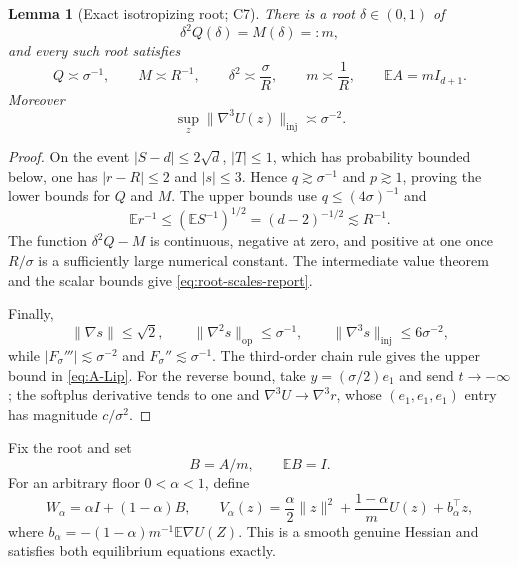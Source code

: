 \documentclass[11pt]{article}
\numberwithin{equation}{section}
\newtheorem{lemma}[theorem]{Lemma}
\newcommand{\E}{\mathbb E}
\newcommand{\op}{\mathrm{op}}
\newcommand{\inj}{\mathrm{inj}}
\begin{document}
\begin{lemma}[Exact isotropizing root; C7]\label{lem:root}
There is a root $\delta\in(0,1)$ of
\begin{equation}\label{eq:root}
 \delta^2Q(\delta)=M(\delta)=:m,
\end{equation}
and every such root satisfies
\begin{equation}\label{eq:root-scales-report}
 Q\asymp\sigma^{-1},\qquad M\asymp R^{-1},\qquad
 \delta^2\asymp\frac\sigma R,\qquad m\asymp\frac1R,\qquad
 \E A=mI_{d+1}.
\end{equation}
Moreover
\begin{equation}\label{eq:A-Lip}
 \sup_z\|\nabla^3U(z)\|_{\inj}\asymp\sigma^{-2}.
\end{equation}
\end{lemma}

\begin{proof}
On the event $|S-d|\le2\sqrt d$, $|T|\le1$, which has probability bounded
below, one has $|r-R|\le2$ and $|s|\le3$.  Hence
$q\gtrsim\sigma^{-1}$ and $p\gtrsim1$, proving the lower bounds for $Q$ and
$M$.  The upper bounds use $q\le(4\sigma)^{-1}$ and
\[
 \E r^{-1}\le(\E S^{-1})^{1/2}=(d-2)^{-1/2}\lesssim R^{-1}.
\]
The function $\delta^2Q-M$ is continuous, negative at zero, and positive at
one once $R/\sigma$ is a sufficiently large numerical constant.  The
intermediate value theorem and the scalar bounds give
\eqref{eq:root-scales-report}.

Finally,
\[
 \|\nabla s\|\le\sqrt2,\qquad
 \|\nabla^2s\|_{\op}\le\sigma^{-1},\qquad
 \|\nabla^3s\|_{\inj}\le6\sigma^{-2},
\]
while $|F_\sigma'''|\lesssim\sigma^{-2}$ and
$F_\sigma''\lesssim\sigma^{-1}$.  The third-order chain rule gives the
upper bound in \eqref{eq:A-Lip}.  For the reverse bound, take
$y=(\sigma/2)e_1$ and send $t\to-\infty$; the softplus derivative tends to
one and $\nabla^3U\to\nabla^3r$, whose $(e_1,e_1,e_1)$ entry has magnitude
$c/\sigma^2$.
\end{proof}

Fix the root and set
\begin{equation}\label{eq:B-base}
 B=A/m,\qquad \E B=I.
\end{equation}
For an arbitrary floor $0<\alpha<1$, define
\begin{equation}\label{eq:floor-family}
 W_\alpha=\alpha I+(1-\alpha)B,\qquad
 V_\alpha(z)=\frac\alpha2\|z\|^2+\frac{1-\alpha}{m}U(z)+b_\alpha^\top z,
\end{equation}
where $b_\alpha=-(1-\alpha)m^{-1}\E\nabla U(Z)$.  This is a smooth genuine
Hessian and satisfies both equilibrium equations exactly.
\end{document}
